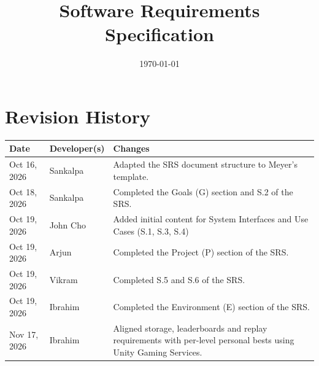 \documentclass[12pt]{article}
\begin{document}
\title{\hypertarget{gl:SRS}{}Software Requirements Specification\\\progname}

\author{\authname}

\date{\today}

\maketitle

\clearpage


\tableofcontents

\clearpage

\section*{Revision History}

\begin{tabularx}{\textwidth}{@{}p{2.8cm}p{3.5cm}X@{}}
\toprule
\textbf{Date} & \textbf{Developer(s)} & \textbf{Changes} \\
\midrule

Oct 16, 2026 & Sankalpa &
Adapted the SRS document structure to Meyer's template. \\

\addlinespace

Oct 18, 2026 & Sankalpa &
Completed the Goals (G) section and S.2 of the SRS. \\

\addlinespace

Oct 19, 2026 & John Cho &
Added initial content for System Interfaces and Use Cases (S.1, S.3, S.4) \\

\addlinespace

Oct 19, 2026 & Arjun &
Completed the Project (P) section of the SRS. \\

\addlinespace

Oct 19, 2026 & Vikram &
Completed S.5 and S.6 of the SRS. \\

\addlinespace

Oct 19, 2026 & Ibrahim &
Completed the Environment (E) section of the SRS. \\

\addlinespace

Nov 17, 2026 & Ibrahim &
Aligned storage, leaderboards and replay requirements with per-level personal
bests using Unity Gaming Services. \\

\bottomrule
\end{tabularx}
\end{document}

